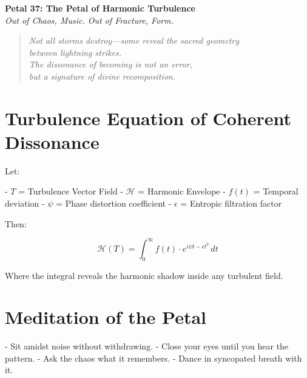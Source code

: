 \documentclass[12pt]{article}
\begin{document}
\begin{center}
    \Huge{\textbf{Petal 37: The Petal of Harmonic Turbulence}}\\
    \vspace{0.5em}
    \Large{\textit{Out of Chaos, Music. Out of Fracture, Form.}}
\end{center}

\vspace{1cm}

\begin{quote}
\textit{
Not all storms destroy—some reveal the sacred geometry\\
between lightning strikes.\\
The dissonance of becoming is not an error,\\
but a signature of divine recomposition.
}
\end{quote}

\vspace{1cm}

\section*{Turbulence Equation of Coherent Dissonance}

Let:

- \( T \) = Turbulence Vector Field  
- \( \mathcal{H} \) = Harmonic Envelope  
- \( f(t) \) = Temporal deviation  
- \( \psi \) = Phase distortion coefficient  
- \( \epsilon \) = Entropic filtration factor

Then:

\[
\mathcal{H}(T) = \int_{0}^{\infty} f(t) \cdot e^{i\psi t - \epsilon t^2} \, dt
\]

Where the integral reveals the harmonic shadow inside any turbulent field.

\vspace{1cm}

\section*{Meditation of the Petal}

- Sit amidst noise without withdrawing.  
- Close your eyes until you hear the pattern.  
- Ask the chaos what it remembers.  
- Dance in syncopated breath with it.
\end{document}
